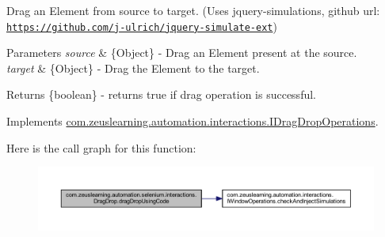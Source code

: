Drag an Element from {\ttfamily source} to {\ttfamily target}. (Uses jquery-\/simulations, github url\+: \href{https://github.com/j-ulrich/jquery-simulate-ext}{\tt https\+://github.\+com/j-\/ulrich/jquery-\/simulate-\/ext})


\begin{DoxyParams}{Parameters}
{\em source} & \{Object\} -\/ Drag an Element present at the {\ttfamily source}. \\
\hline
{\em target} & \{Object\} -\/ Drag the Element to the {\ttfamily target}.\\
\hline
\end{DoxyParams}
\begin{DoxyReturn}{Returns}
\{boolean\} -\/ returns {\ttfamily true} if drag operation is successful. 
\end{DoxyReturn}


Implements \hyperlink{interfacecom_1_1zeuslearning_1_1automation_1_1interactions_1_1IDragDropOperations_afed1b914e214a57c5479d9f34f638f24}{com.\+zeuslearning.\+automation.\+interactions.\+I\+Drag\+Drop\+Operations}.

Here is the call graph for this function\+:
\nopagebreak
\begin{figure}[H]
\begin{center}
\leavevmode
\includegraphics[width=350pt]{d3/d41/classcom_1_1zeuslearning_1_1automation_1_1selenium_1_1interactions_1_1DragDrop_acb4e035b12c5502ff045b5bede2e50d3_cgraph}
\end{center}
\end{figure}
\hypertarget{classcom_1_1zeuslearning_1_1automation_1_1selenium_1_1interactions_1_1DragDrop_a02c5aee5ea424d0c247bff0c7e76dd97}{}\label{classcom_1_1zeuslearning_1_1automation_1_1selenium_1_1interactions_1_1DragDrop_a02c5aee5ea424d0c247bff0c7e76dd97} 
